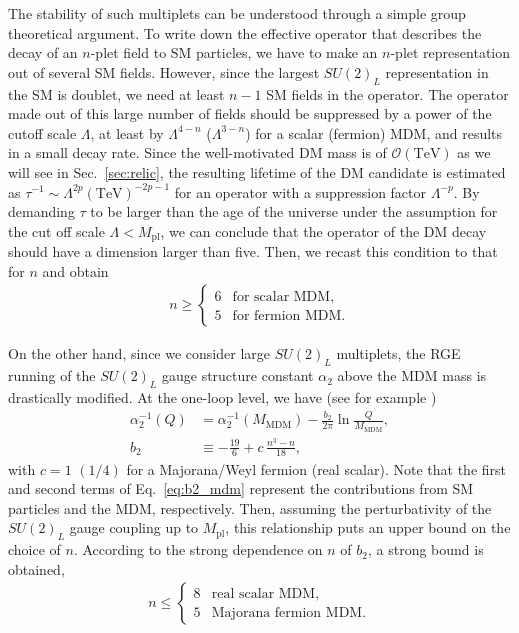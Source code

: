 \documentclass[12pt,twoside,book]{article}
\begin{document}
The stability of such multiplets can be understood through a simple group theoretical argument.
To write down the effective operator that describes the decay of an $n$-plet field to SM particles, we have to make an $n$-plet representation out of several SM fields.
However, since the largest $SU(2)_L$ representation in the SM is doublet, we need at least $n-1$ SM fields in the operator.
The operator made out of this large number of fields should be suppressed by a power of the cutoff scale $\Lambda$, at least by $\Lambda^{4-n}$ ($\Lambda^{3-n}$) for a scalar (fermion) MDM, and results in a small decay rate.
Since the well-motivated DM mass is of $\mathcal{O} (\mathrm{TeV})$ as we will see in Sec.~\ref{sec:relic}, the resulting lifetime of the DM candidate is estimated as $\tau^{-1} \sim \Lambda^{2p} (\mathrm{TeV})^{-2p-1}$ for an operator with a suppression factor $\Lambda^{-p}$.
By demanding $\tau$ to be larger than the age of the universe under the assumption for the cut off scale $\Lambda < M_{\mathrm{pl}}$, we can conclude that the operator of the DM decay should have a dimension larger than five.
Then, we recast this condition to that for $n$ and obtain
\begin{align}
  n \geq
  \begin{cases}
    6 & \text{for scalar MDM},\\
    5 & \text{for fermion MDM}.
  \end{cases}
\end{align}

On the other hand, since we consider large $SU(2)_L$ multiplets, the RGE running of the $SU(2)_L$ gauge structure constant $\alpha_2$ above the MDM mass is drastically modified.
At the one-loop level, we have (see for example \cite{Machacek:1983tz})
\begin{align}
  \alpha_2^{-1} (Q) &= \alpha_2^{-1} (M_{\mathrm{MDM}}) - \frac{b_2}{2\pi} \ln \frac{Q}{M_{\mathrm{MDM}}},\\
  b_2 &\equiv -\frac{19}{6} + c\, \frac{n^3 - n}{18},
  \label{eq:b2_mdm}
\end{align}
with $c = 1$ $(1/4)$ for a Majorana/Weyl fermion (real scalar).
Note that the first and second terms of Eq.~\eqref{eq:b2_mdm} represent the contributions from SM particles and the MDM, respectively.
Then, assuming the perturbativity of the $SU(2)_L$ gauge coupling up to $M_{\mathrm{pl}}$, this relationship puts an upper bound on the choice of $n$.
According to the strong dependence on $n$ of $b_2$, a strong bound is obtained,
\begin{align}
  n \leq
  \begin{cases}
    8 & \text{real scalar MDM},\\
    5 & \text{Majorana fermion MDM}.
  \end{cases}
\end{align}
\end{document}
